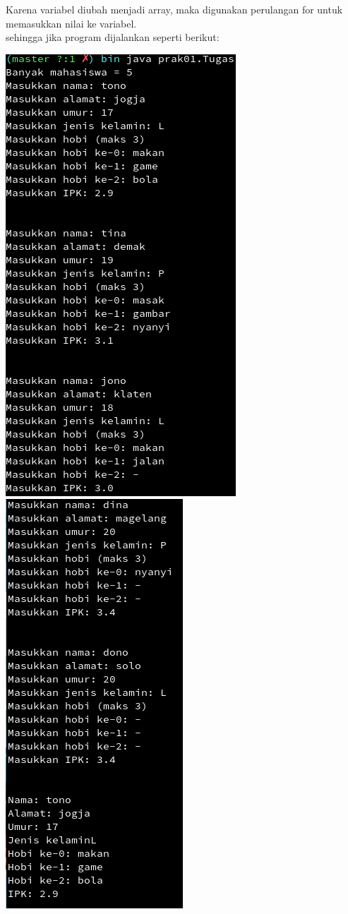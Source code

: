\documentclass[a4paper,12pt]{article}
\begin{document}
Karena variabel diubah menjadi array, maka digunakan perulangan for untuk memasukkan
nilai ke variabel.\\

sehingga jika program dijalankan seperti berikut:\\
\begin{center}
    \includegraphics[scale=1]{tugas01.png} 
    \includegraphics[scale=1]{tugas02.png} 

\end{center}
\end{document}
